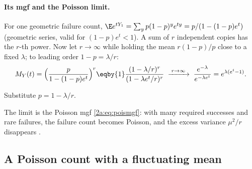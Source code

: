 \paragraph{Its mgf and the Poisson limit.} For one geometric failure count, $\E e^{tY_1}=\sum_yp(1-p)^ye^{ty}=p/(1-(1-p)e^t)$ (geometric series, valid for $(1-p)e^t<1$). A sum of $r$ independent copies has the $r$-th power. Now let $r\to\infty$ while holding the mean $r(1-p)/p$ close to a fixed $\lambda$; to leading order $1-p=\lambda/r$:
\begin{align*}
  M_Y(t)=\Bigl(\frac{p}{1-(1-p)e^t}\Bigr)^r
  \eqby{1} \frac{(1-\lambda/r)^r}{(1-\lambda e^t/r)^r}
  \;\xrightarrow{\;r\to\infty\;}\; \frac{e^{-\lambda}}{e^{-\lambda e^t}} = e^{\lambda(e^t-1)} .
\end{align*}
\begin{explain}
  \item Substitute $p=1-\lambda/r$.
\end{explain}
The limit is the Poisson mgf \eqref{2a:eq:poismgf}: with many required successes and rare failures, the failure count becomes Poisson, and the excess variance $\mu^2/r$ disappears .

\subsection{A Poisson count with a fluctuating mean}


